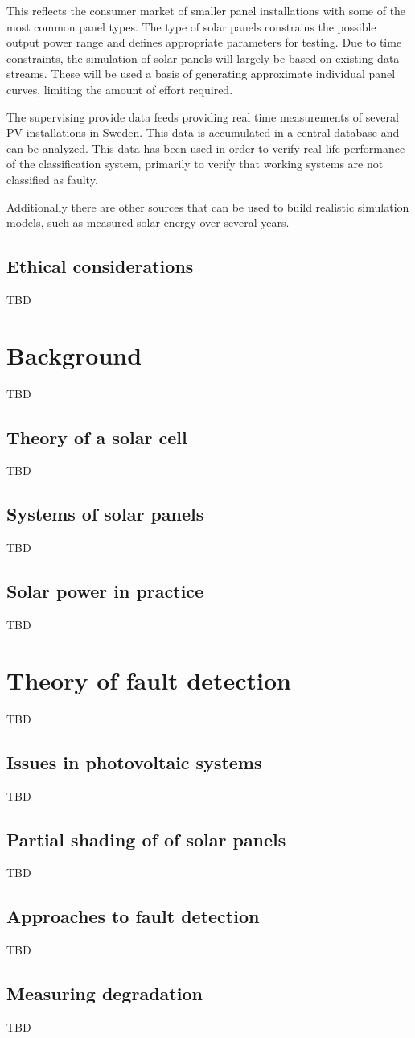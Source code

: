 This reflects the consumer market of smaller panel installations with some of the most common panel types.
The type of solar panels constrains the possible output power range and defines appropriate parameters for testing.
Due to time constraints, the simulation of solar panels will largely be based on existing data streams.
These will be used a basis of generating approximate individual panel curves, limiting the amount of effort required.

The supervising provide data feeds providing real time measurements of several PV installations in Sweden.
This data is accumulated in a central database and can be analyzed.
This data has been used in order to verify real-life performance of the classification system, primarily to verify that working systems are not classified as faulty.

Additionally there are other sources that can be used to build realistic simulation models, such as measured solar energy over several years.

\section{Ethical considerations}
TBD


\chapter{Background}
TBD

\section{Theory of a solar cell}
TBD

\section{Systems of solar panels}
TBD

\section{Solar power in practice}
TBD


\chapter{Theory of fault detection}
TBD

\section{Issues in photovoltaic systems}
TBD

\section{Partial shading of of solar panels}
TBD

\section{Approaches to fault detection}
TBD

\section{Measuring degradation}
TBD





